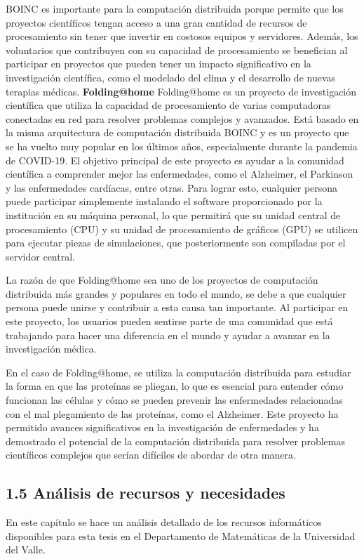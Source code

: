 \begin{doublespace}
\begin{multicols}{2}
  BOINC es importante para la computación distribuida porque permite que los proyectos científicos tengan acceso a una gran cantidad de recursos de procesamiento sin tener que invertir en costosos equipos y servidores. Además, los voluntarios que contribuyen con su capacidad de procesamiento se benefician al participar en proyectos que pueden tener un impacto significativo en la investigación científica, como el modelado del clima y el desarrollo de nuevas terapias médicas. \cite{BOINC-1}
  \newpage
  \textbf{Folding@home}
  \newline
  Folding@home es un proyecto de investigación científica que utiliza la capacidad de procesamiento de varias computadoras conectadas en red para resolver problemas complejos y avanzados. Está basado en la misma arquitectura de computación distribuida BOINC y es un proyecto que se ha vuelto muy popular en los últimos años, especialmente durante la pandemia de COVID-19. El objetivo principal de este proyecto es ayudar a la comunidad científica a comprender mejor las enfermedades, como el Alzheimer, el Parkinson y las enfermedades cardíacas, entre otras. Para lograr esto, cualquier persona puede participar simplemente instalando el software proporcionado por la institución en su máquina personal, lo que permitirá que su unidad central de procesamiento (CPU) y su unidad de procesamiento de gráficos (GPU) se utilicen para ejecutar piezas de simulaciones, que posteriormente son compiladas por el servidor central.

  La razón de que Folding@home sea uno de los proyectos de computación distribuida más grandes y populares en todo el mundo, se debe a que cualquier persona puede unirse y contribuir a esta causa tan importante. Al participar en este proyecto, los usuarios pueden sentirse parte de una comunidad que está trabajando para hacer una diferencia en el mundo y ayudar a avanzar en la investigación médica.

  En el caso de Folding@home, se utiliza la computación distribuida para estudiar la forma en que las proteínas se pliegan, lo que es esencial para entender cómo funcionan las células y cómo se pueden prevenir las enfermedades relacionadas con el mal plegamiento de las proteínas, como el Alzheimer. Este proyecto ha permitido avances significativos en la investigación de enfermedades y ha demostrado el potencial de la computación distribuida para resolver problemas científicos complejos que serían difíciles de abordar de otra manera. \cite{Folding@home-1}
  \subsection{1.5 Análisis de recursos y necesidades}
  En este capítulo se hace un análisis detallado de los recursos informáticos disponibles para esta tesis en el Departamento de Matemáticas de la Universidad del Valle.


\end{multicols}
\end{doublespace}
